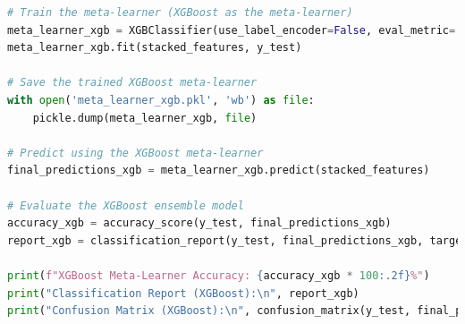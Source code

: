\begin{tcolorbox}[colback=gray!5!white, colframe=gray!80!black, boxrule=0.5pt, title=Evaluate Meta-Learner and Ensemble Model]
    \begin{lstlisting}[language=Python]
# Train the meta-learner (XGBoost as the meta-learner)
meta_learner_xgb = XGBClassifier(use_label_encoder=False, eval_metric='mlogloss')
meta_learner_xgb.fit(stacked_features, y_test)

# Save the trained XGBoost meta-learner
with open('meta_learner_xgb.pkl', 'wb') as file:
    pickle.dump(meta_learner_xgb, file)

# Predict using the XGBoost meta-learner
final_predictions_xgb = meta_learner_xgb.predict(stacked_features)

# Evaluate the XGBoost ensemble model
accuracy_xgb = accuracy_score(y_test, final_predictions_xgb)
report_xgb = classification_report(y_test, final_predictions_xgb, target_names=label_encoder.classes_)

print(f"XGBoost Meta-Learner Accuracy: {accuracy_xgb * 100:.2f}%")
print("Classification Report (XGBoost):\n", report_xgb)
print("Confusion Matrix (XGBoost):\n", confusion_matrix(y_test, final_predictions_xgb))
\end{lstlisting}
\end{tcolorbox}
 
